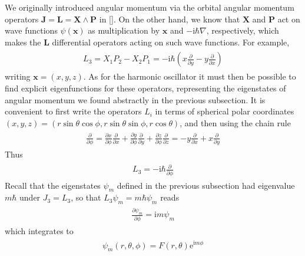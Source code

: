 We originally introduced angular momentum via the orbital angular momentum operators $\mathbf{J}= \mathbf{L}=\mathbf{X} \wedge \mathbf{P}$ in \eqref{}. 
On the other hand, we know that $\mathbf{X}$ and $\mathbf{P}$ act on wave functions $\psi(\mathbf{x})$ as multiplication by $\mathbf{x}$ and $-\mathrm{i} \hbar \nabla$, respectively, which makes the $\mathbf{L}$ differential operators acting on such wave functions. 
For example,
\begin{align}
\begin{aligned}
	L_{3}=X_{1} P_{2}-X_{2} P_{1}=-\mathrm{i} \hbar\left(x \frac{\partial}{\partial y}-y \frac{\partial}{\partial x}\right)
\end{aligned}
\end{align}
writing $\mathbf{x}=(x, y, z)$. 
As for the harmonic oscillator it must then be possible to find explicit eigenfunctions for these operators, representing the eigenstates of angular momentum we found abstractly in the previous subsection. 
It is convenient to first write the operators $L_{i}$ in terms of spherical polar coordinates $(x, y, z)=( r \sin \theta \cos \phi, r \sin \theta \sin \phi, r \cos \theta )$, and then using the chain rule
\begin{align}
\begin{aligned}
	\frac{\partial}{\partial \phi}=\frac{\partial x}{\partial \phi} \frac{\partial}{\partial x}+\frac{\partial y}{\partial \phi} \frac{\partial}{\partial y}+\frac{\partial z}{\partial \phi} \frac{\partial}{\partial z}=-y \frac{\partial}{\partial x}+x \frac{\partial}{\partial y}
\end{aligned}
\end{align}
Thus
\begin{align}
\begin{aligned}
	L_{3}=-\mathrm{i} \hbar \frac{\partial}{\partial \phi}
\end{aligned}
\end{align}
Recall that the eigenstates $\psi_{m}$ defined in the previous subsection had eigenvalue $m \hbar$ under $J_{3}=L_{3}$, so that $L_{3} \psi_{m}=m \hbar \psi_{m}$ reads
\begin{align}
\begin{aligned}
	\frac{\partial \psi_{m}}{\partial \phi}=\mathrm{i} m \psi_{m}
\end{aligned}
\end{align}
which integrates to
\begin{align}
\begin{aligned}
	\psi_{m}(r, \theta, \phi)=F(r, \theta) \mathrm{e}^{\mathrm{i} m \phi}
\end{aligned}
\end{align}
